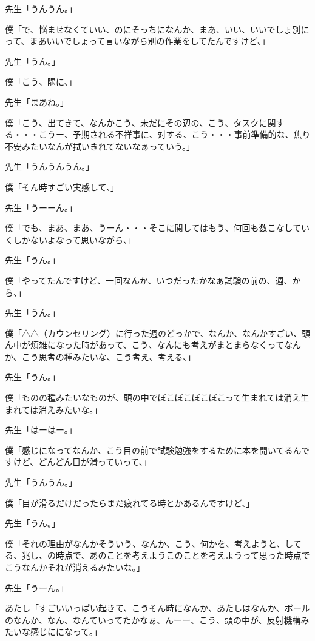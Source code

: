 \documentclass[b5j,twoside,twocolumn]{utarticle}
\begin{document}
\begin{description}
\item 先生「うんうん。」
\item 僕「で、悩ませなくていい、のにそっちになんか、まあ、いい、いいでしょ別にって、まあいいでしょって言いながら別の作業をしてたんですけど、」
\item 先生「うん。」
\item 僕「こう、隅に、」
\item 先生「まあね。」
\item 僕「こう、出てきて、なんかこう、未だにその辺の、こう、タスクに関する・・・こうー、予期される不祥事に、対する、こう・・・事前準備的な、焦り不安みたいなんが拭いきれてないなぁっていう。」
\item 先生「うんうんうん。」
\item 僕「そん時すごい実感して、」
\item 先生「うーーん。」
\item 僕「でも、まあ、まあ、うーん・・・そこに関してはもう、何回も数こなしていくしかないよなって思いながら、」
\item 先生「うん。」
\item 僕「やってたんですけど、一回なんか、いつだったかなぁ試験の前の、週、から、」
\item 先生「うん。」
\item 僕「△△（カウンセリング）に行った週のどっかで、なんか、なんかすごい、頭ん中が煩雑になった時があって、こう、なんにも考えがまとまらなくってなんか、こう思考の種みたいな、こう考え、考える、」
\item 先生「うん。」
\item 僕「ものの種みたいなものが、頭の中でぼこぼこぼこぼこって生まれては消え生まれては消えみたいな。」
\item 先生「はーはー。」
\item 僕「感じになってなんか、こう目の前で試験勉強をするために本を開いてるんですけど、どんどん目が滑っていって、」
\item 先生「うんうん。」
\item 僕「目が滑るだけだったらまだ疲れてる時とかあるんですけど、」
\item 先生「うん。」
\item 僕「それの理由がなんかそういう、なんか、こう、何かを、考えようと、してる、兆し、の時点で、あのことを考えようこのことを考えようって思った時点でこうなんかそれが消えるみたいな。」
\item 先生「うーん。」
\item あたし「すごいいっぱい起きて、こうそん時になんか、あたしはなんか、ボールのなんか、なん、なんていってたかなぁ、んーー、こう、頭の中が、反射機構みたいな感じにになって。」

\end{description}
\end{document}

